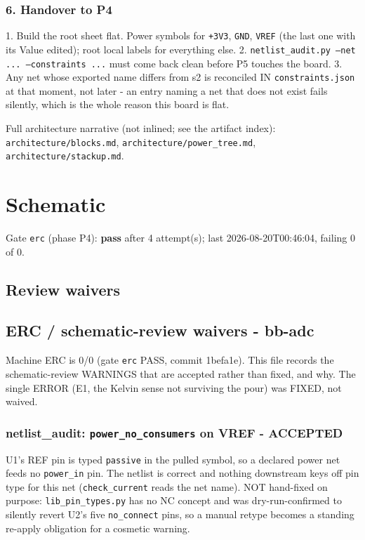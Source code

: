 \documentclass[11pt,a4paper]{article}
\begin{document}
\subsubsection*{6. Handover to P4}
1. Build the root sheet flat. Power symbols for \texttt{+3V3}, \texttt{GND}, \texttt{VREF} (the last one with its Value edited); root local labels for everything else. 2. \texttt{netlist\_audit.py --net ... --constraints ...} must come back clean before P5 touches the board. 3. Any net whose exported name differs from s2 is reconciled IN \texttt{constraints.json} at that moment, not later - an entry naming a net that does not exist fails silently, which is the whole reason this board is flat.

Full architecture narrative (not inlined; see the artifact index): \texttt{architecture/blocks.md}, \texttt{architecture/power\_tree.md}, \texttt{architecture/stackup.md}.
\section{Schematic}
Gate \texttt{erc} (phase P4): \textbf{pass} after 4 attempt(s); last 2026-08-20T00:46:04, failing 0 of 0.
\subsection*{Review waivers}
\subsection*{ERC / schematic-review waivers - bb-adc}
Machine ERC is 0/0 (gate \texttt{erc} PASS, commit 1befa1e). This file records the schematic-review WARNINGS that are accepted rather than fixed, and why. The single ERROR (E1, the Kelvin sense not surviving the pour) was FIXED, not waived.

\subsubsection*{netlist\_audit: \texttt{power\_no\_consumers} on VREF - ACCEPTED}
U1's REF pin is typed \texttt{passive} in the pulled symbol, so a declared power net feeds no \texttt{power\_in} pin. The netlist is correct and nothing downstream keys off pin type for this net (\texttt{check\_current} reads the net name). NOT hand-fixed on purpose: \texttt{lib\_pin\_types.py} has no NC concept and was dry-run-confirmed to silently revert U2's five \texttt{no\_connect} pins, so a manual retype becomes a standing re-apply obligation for a cosmetic warning.
\end{document}
